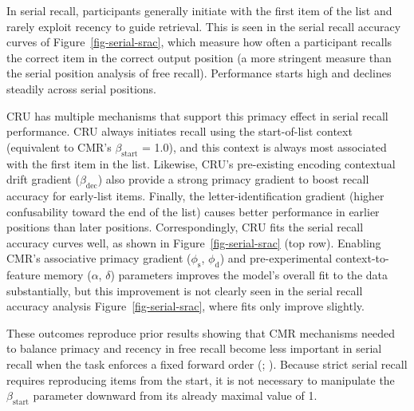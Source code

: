 \documentclass[
  man,
  floatsintext,
  longtable,
  nolmodern,
  notxfonts,
  notimes,
  draftfirst,
  colorlinks=true,linkcolor=blue,citecolor=blue,urlcolor=blue]{apa7}
\begin{document}
\begin{figure}
\end{figure}%

In serial recall, participants generally initiate with the first item of
the list and rarely exploit recency to guide retrieval. This is seen in
the serial recall accuracy curves of Figure~\ref{fig-serial-srac}, which
measure how often a participant recalls the correct item in the correct
output position (a more stringent measure than the serial position
analysis of free recall). Performance starts high and declines steadily
across serial positions.

CRU has multiple mechanisms that support this primacy effect in serial
recall performance. CRU always initiates recall using the start-of-list
context (equivalent to CMR's \(\beta_\text{start}\) = 1.0), and this
context is always most associated with the first item in the list.
Likewise, CRU's pre-existing encoding contextual drift gradient
(\(\beta_\text{dec}\)) also provide a strong primacy gradient to boost
recall accuracy for early-list items. Finally, the letter-identification
gradient (higher confusability toward the end of the list) causes better
performance in earlier positions than later positions. Correspondingly,
CRU fits the serial recall accuracy curves well, as shown in
Figure~\ref{fig-serial-srac} (top row). Enabling CMR's associative
primacy gradient (\(\phi_\text{s}\), \(\phi_\text{d}\)) and
pre-experimental context-to-feature memory (\(\alpha\), \(\delta\))
parameters improves the model's overall fit to the data substantially,
but this improvement is not clearly seen in the serial recall accuracy
analysis Figure~\ref{fig-serial-srac}, where fits only improve slightly.

These outcomes reproduce prior results showing that CMR mechanisms
needed to balance primacy and recency in free recall become less
important in serial recall when the task enforces a fixed forward order
(;
). Because strict serial
recall requires reproducing items from the start, it is not necessary to
manipulate the \(\beta_\text{start}\) parameter downward from its
already maximal value of 1.
\end{document}
